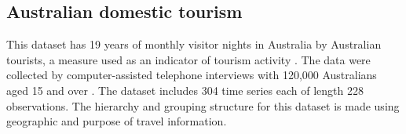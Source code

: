 \documentclass[11pt,a4paper,]{article}
\begin{document}
\hypertarget{australian-domestic-tourism}{%
\subsection{Australian domestic
tourism}\label{australian-domestic-tourism}}

This dataset has 19 years of monthly visitor nights in Australia by
Australian tourists, a measure used as an indicator of tourism activity
\autocite{mint2018}. The data were collected by computer-assisted
telephone interviews with 120,000 Australians aged 15 and over
\autocite{researchAustralia2005}. The dataset includes 304 time series
each of length 228 observations. The hierarchy and grouping structure
for this dataset is made using geographic and purpose of travel
information.

\begingroup\fontsize{9}{11}\selectfont
\end{document}
